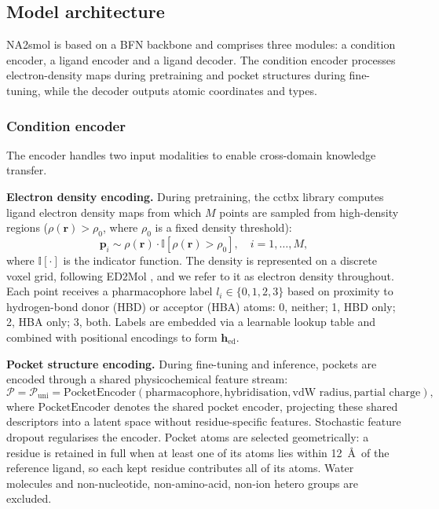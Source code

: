 \documentclass[pdflatex,sn-mathphys-num]{sn-jnl}
\theoremstyle{thmstyleone}
\theoremstyle{thmstyletwo}
\theoremstyle{thmstylethree}
\begin{document}
\subsection{Model architecture}

NA2smol is based on a BFN backbone \cite{graves2023bfn} and comprises three modules: a condition encoder, a ligand encoder and a ligand decoder. The condition encoder processes electron-density maps during pretraining and pocket structures during fine-tuning, while the decoder outputs atomic coordinates and types.

\subsubsection{Condition encoder}

The encoder handles two input modalities to enable cross-domain knowledge transfer.

\medskip
\noindent\textbf{Electron density encoding.} During pretraining, the cctbx library \cite{grossekunstleve2002cctbx} computes ligand electron density maps from which \(M\) points are sampled from high-density regions (\(\rho(\mathbf{r}) > \rho_0\), where \(\rho_0\) is a fixed density threshold):
\[
\mathbf{p}_i \sim \rho(\mathbf{r}) \cdot \mathbb{I}[\rho(\mathbf{r}) > \rho_0], \quad i=1,\dots,M,
\]
where \(\mathbb{I}[\cdot]\) is the indicator function. The density is represented on a discrete voxel grid, following ED2Mol \cite{ed2mol2025}, and we refer to it as electron density throughout. Each point receives a pharmacophore label \(l_i \in \{0,1,2,3\}\) based on proximity to hydrogen-bond donor (HBD) or acceptor (HBA) atoms: 0, neither; 1, HBD only; 2, HBA only; 3, both. Labels are embedded via a learnable lookup table and combined with positional encodings to form \(\mathbf{h}_{\text{ed}}\).

\medskip
\noindent\textbf{Pocket structure encoding.} During fine-tuning and inference, pockets are encoded through a shared physicochemical feature stream:
\begin{equation}
\mathcal{P} = \mathcal{P}_{\text{uni}} = \text{PocketEncoder}(\text{pharmacophore}, \text{hybridisation}, \text{vdW radius}, \text{partial charge}),
\end{equation}
where $\text{PocketEncoder}$ denotes the shared pocket encoder, projecting these shared descriptors into a latent space without residue-specific features. Stochastic feature dropout regularises the encoder. Pocket atoms are selected geometrically: a residue is retained in full when at least one of its atoms lies within 12~\AA\ of the reference ligand, so each kept residue contributes all of its atoms. Water molecules and non-nucleotide, non-amino-acid, non-ion hetero groups are excluded.
\end{document}
